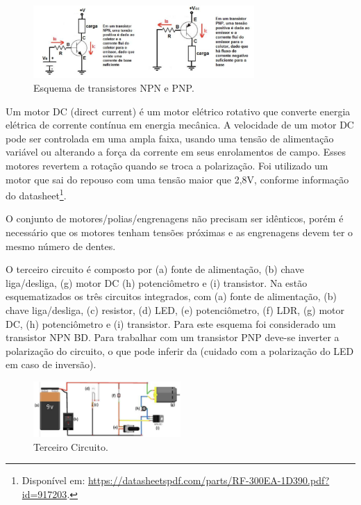 \documentclass{textolivre}
\begin{document}
\begin{figure}[h!]
\centering
\includegraphics[width=0.75\textwidth]{figure-18.pdf}
\caption{Esquema de transistores NPN e PNP.}
\label{fig12}
\end{figure}
 
Um motor DC (direct current) é um motor elétrico rotativo que converte energia
elétrica de corrente contínua em energia mecânica. A velocidade de um motor DC
pode ser controlada em uma ampla faixa, usando uma tensão de alimentação
variável ou alterando a força da corrente em seus enrolamentos de campo. Esses
motores revertem a rotação quando se troca a polarização. Foi utilizado um
motor que sai do repouso com uma tensão maior que 2,8V, conforme informação do
datasheet\footnote{Disponível em:
\url{https://datasheetspdf.com/parts/RF-300EA-1D390.pdf?id=917203}.}.

O conjunto de motores/polias/engrenagens não precisam ser idênticos, porém é
necessário que os motores tenham tensões próximas e as engrenagens devem ter o
mesmo número de dentes.

O terceiro circuito é composto por (a) fonte de alimentação, (b) chave
liga/desliga, (g) motor DC (h) potenciômetro e (i) transistor. Na 
estão esquematizados os três circuitos integrados, com (a) fonte de
alimentação, (b) chave liga/desliga, (c) resistor, (d) LED, (e) potenciômetro,
(f) LDR, (g) motor DC, (h) potenciômetro e (i) transistor. Para este esquema
foi considerado um transistor NPN BD. Para trabalhar com um transistor PNP
deve-se inverter a polarização do circuito, o que pode inferir da 
(cuidado com a polarização do LED em caso de inversão).

\begin{figure}[h!]
\centering
\includegraphics[width=0.5\textwidth]{figure-19.pdf}
\caption{Terceiro Circuito.}
\label{fig13}
\end{figure}
\end{document}
